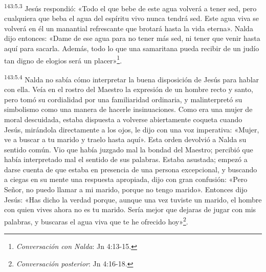 \par
\textsuperscript{143:5.3} Jesús respondió: «Todo el que bebe de este agua volverá a tener sed, pero cualquiera que beba el agua del espíritu vivo nunca tendrá sed. Este agua viva se volverá en él un manantial refrescante que brotará hasta la vida eterna». Nalda dijo entonces: «Dame de ese agua para no tener más sed, ni tener que venir hasta aquí para sacarla. Además, todo lo que una samaritana pueda recibir de un judío tan digno de elogios será un placer»\footnote{\textit{Conversación con Nalda}: Jn 4:13-15.}.

\par
\textsuperscript{143:5.4} Nalda no sabía cómo interpretar la buena disposición de Jesús para hablar con ella. Veía en el rostro del Maestro la expresión de un hombre recto y santo, pero tomó su cordialidad por una familiaridad ordinaria, y malinterpretó su simbolismo como una manera de hacerle insinuaciones. Como era una mujer de moral descuidada, estaba dispuesta a volverse abiertamente coqueta cuando Jesús, mirándola directamente a los ojos, le dijo con una voz imperativa: «Mujer, ve a buscar a tu marido y traelo hasta aquí». Esta orden devolvió a Nalda su sentido común. Vio que había juzgado mal la bondad del Maestro; percibió que había interpretado mal el sentido de sus palabras. Estaba asustada; empezó a darse cuenta de que estaba en presencia de una persona excepcional, y buscando a ciegas en su mente una respuesta apropiada, dijo con gran confusión: «Pero Señor, no puedo llamar a mi marido, porque no tengo marido». Entonces dijo Jesús: «Has dicho la verdad porque, aunque una vez tuviste un marido, el hombre con quien vives ahora no es tu marido. Sería mejor que dejaras de jugar con mis palabras, y buscaras el agua viva que te he ofrecido hoy»\footnote{\textit{Conversación posterior}: Jn 4:16-18.}.

